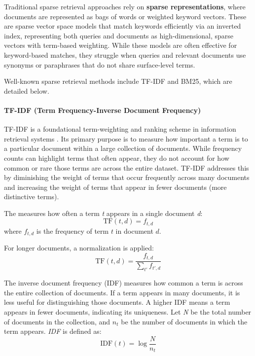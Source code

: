 Traditional sparse retrieval approaches rely on \textbf{sparse representations}, where documents are represented as bags of words or weighted keyword vectors. These are sparse vector space models that match keywords efficiently via an inverted index, representing both queries and documents as high-dimensional, sparse vectors with term-based weighting. While these models are often effective for keyword-based matches, they struggle when queries and relevant documents use synonyms or paraphrases that do not share surface-level terms.

Well-known sparse retrieval methods include TF-IDF and BM25, which are detailed below.

\paragraph{TF-IDF (Term Frequency-Inverse Document Frequency)}

TF-IDF is a foundational term-weighting and ranking scheme in information retrieval systems \cite{tf-idf}. Its primary purpose is to measure how important a term is to a particular document within a large collection of documents. While frequency counts can highlight terms that often appear, they do not account for how common or rare those terms are across the entire dataset. TF-IDF addresses this by diminishing the weight of terms that occur frequently across many documents and increasing the weight of terms that appear in fewer documents (more distinctive terms).

The  measures how often a term \textit{t} appears in a single document \textit{d}:
\begin{equation}
    \label{eq:tf} 
    \text{TF}(t,d)=f_{t,d}
\end{equation}
where $f_{t,d}$ is the frequency of term $t$ in document $d$.

For longer documents, a normalization is applied:
\begin{equation}
    \label{eq:tf(t,d)}
    \text{TF}(t,d) = \frac{f_{t,d}}{\sum_{t'}f_{t',d}}
\end{equation}

The inverse document frequency (IDF) measures how common a term is across the entire collection of documents. If a term appears in many documents, it is less useful for distinguishing those documents. A higher IDF means a term appears in fewer documents, indicating its uniqueness. Let \textit{N} be the total number of documents in the collection, and $n_t$ be the number of documents in which the term appears. \textit{IDF} is defined as:
\begin{equation}
    \label{eq:idftf}
    \text{IDF}(t)=\log\frac{N}{n_t}
\end{equation}

